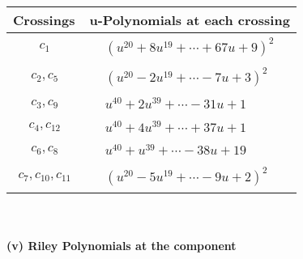 \documentclass[1p]{elsarticle_modified}
\theoremstyle{definition}
\begin{document}
\begin{tabular}{m{50pt}|m{274pt}}
Crossings & \hspace{64pt}u-Polynomials at each crossing \\
\hline $$\begin{aligned}c_{1}\end{aligned}$$&$\begin{aligned}
&(u^{20}+8 u^{19}+\cdots+67 u+9)^{2}
\end{aligned}$\\
\hline $$\begin{aligned}c_{2},c_{5}\end{aligned}$$&$\begin{aligned}
&(u^{20}-2 u^{19}+\cdots-7 u+3)^{2}
\end{aligned}$\\
\hline $$\begin{aligned}c_{3},c_{9}\end{aligned}$$&$\begin{aligned}
&u^{40}+2 u^{39}+\cdots-31 u+1
\end{aligned}$\\
\hline $$\begin{aligned}c_{4},c_{12}\end{aligned}$$&$\begin{aligned}
&u^{40}+4 u^{39}+\cdots+37 u+1
\end{aligned}$\\
\hline $$\begin{aligned}c_{6},c_{8}\end{aligned}$$&$\begin{aligned}
&u^{40}+u^{39}+\cdots-38 u+19
\end{aligned}$\\
\hline $$\begin{aligned}c_{7},c_{10},c_{11}\end{aligned}$$&$\begin{aligned}
&(u^{20}-5 u^{19}+\cdots-9 u+2)^{2}
\end{aligned}$\\
\hline
\end{tabular}\\~\\
\newpage\renewcommand{\arraystretch}{1}
\flushleft \textbf{(v) Riley Polynomials at the component}\newline \\
\end{document}
